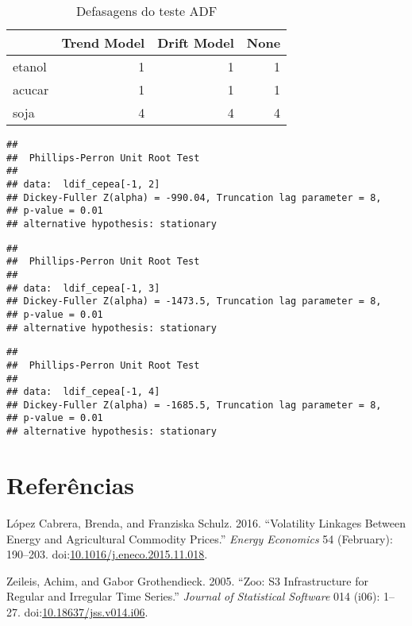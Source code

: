 \documentclass[]{article}
\begin{document}
\begin{longtable}[t]{lrrr}
\caption{\label{tab:ADF e KPSS}Defasagens do teste ADF}\\
\toprule
  & Trend Model & Drift Model & None\\
\midrule
etanol & 1 & 1 & 1\\
acucar & 1 & 1 & 1\\
soja & 4 & 4 & 4\\
\bottomrule
\end{longtable}

\begin{verbatim}
## 
##  Phillips-Perron Unit Root Test
## 
## data:  ldif_cepea[-1, 2]
## Dickey-Fuller Z(alpha) = -990.04, Truncation lag parameter = 8,
## p-value = 0.01
## alternative hypothesis: stationary
\end{verbatim}

\begin{verbatim}
## 
##  Phillips-Perron Unit Root Test
## 
## data:  ldif_cepea[-1, 3]
## Dickey-Fuller Z(alpha) = -1473.5, Truncation lag parameter = 8,
## p-value = 0.01
## alternative hypothesis: stationary
\end{verbatim}

\begin{verbatim}
## 
##  Phillips-Perron Unit Root Test
## 
## data:  ldif_cepea[-1, 4]
## Dickey-Fuller Z(alpha) = -1685.5, Truncation lag parameter = 8,
## p-value = 0.01
## alternative hypothesis: stationary
\end{verbatim}

\pagebreak

\section*{Referências}\label{referencias}

\setlength{\parindent}{0in}

\hypertarget{refs}{}
\hypertarget{ref-lopez_cabrera_volatility_2016}{}
López Cabrera, Brenda, and Franziska Schulz. 2016. ``Volatility Linkages
Between Energy and Agricultural Commodity Prices.'' \emph{Energy
Economics} 54 (February): 190--203.
doi:\href{https://doi.org/10.1016/j.eneco.2015.11.018}{10.1016/j.eneco.2015.11.018}.

\hypertarget{ref-zeileis_zoo:_2005}{}
Zeileis, Achim, and Gabor Grothendieck. 2005. ``Zoo: S3 Infrastructure
for Regular and Irregular Time Series.'' \emph{Journal of Statistical
Software} 014 (i06): 1--27.
doi:\href{https://doi.org/10.18637/jss.v014.i06}{10.18637/jss.v014.i06}.
\end{document}
